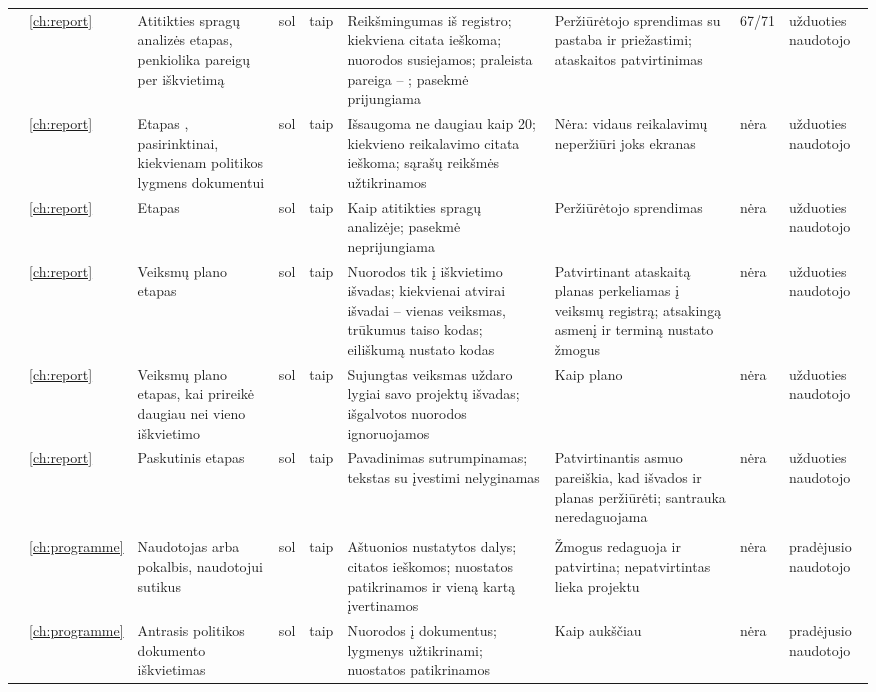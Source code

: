 \begin{landscape}
\begin{xltabular}{\linewidth}{@{}>{\scriptsize}L{31mm}>{\scriptsize}L{6mm}>{\scriptsize}L{36mm}>{\scriptsize}L{15mm}>{\scriptsize}L{9mm}>{\scriptsize}Y>{\scriptsize}L{38mm}>{\scriptsize}L{19mm}>{\scriptsize}L{25mm}@{}}
 & \ref{ch:report} & Atitikties spragų analizės etapas, penkiolika pareigų per iškvietimą & sol & taip & Reikšmingumas iš registro; kiekviena citata ieškoma; nuorodos susiejamos; praleista pareiga -- ; pasekmė prijungiama & Peržiūrėtojo sprendimas su pastaba ir priežastimi; ataskaitos patvirtinimas &  67/71 & užduoties naudotojo \\
 & \ref{ch:report} & Etapas , pasirinktinai, kiekvienam politikos lygmens dokumentui & sol & taip & Išsaugoma ne daugiau kaip 20; kiekvieno reikalavimo citata ieškoma; sąrašų reikšmės užtikrinamos & Nėra: vidaus reikalavimų neperžiūri joks ekranas & nėra & užduoties naudotojo \\
 & \ref{ch:report} & Etapas  & sol & taip & Kaip atitikties spragų analizėje; pasekmė neprijungiama & Peržiūrėtojo sprendimas & nėra & užduoties naudotojo \\
 & \ref{ch:report} & Veiksmų plano etapas & sol & taip & Nuorodos tik į iškvietimo išvadas; kiekvienai atvirai išvadai -- vienas veiksmas, trūkumus taiso kodas; eiliškumą nustato kodas & Patvirtinant ataskaitą planas perkeliamas į veiksmų registrą; atsakingą asmenį ir terminą nustato žmogus & nėra & užduoties naudotojo \\
 & \ref{ch:report} & Veiksmų plano etapas, kai prireikė daugiau nei vieno iškvietimo & sol & taip & Sujungtas veiksmas uždaro lygiai savo projektų išvadas; išgalvotos nuorodos ignoruojamos & Kaip plano & nėra & užduoties naudotojo \\
 & \ref{ch:report} & Paskutinis etapas & sol & taip & Pavadinimas sutrumpinamas; tekstas su įvestimi nelyginamas & Patvirtinantis asmuo pareiškia, kad išvados ir planas peržiūrėti; santrauka neredaguojama & nėra & užduoties naudotojo \\
\midrule
{} \\
 & \ref{ch:programme} & Naudotojas arba pokalbis, naudotojui sutikus & sol & taip & Aštuonios nustatytos dalys; citatos ieškomos; nuostatos patikrinamos ir vieną kartą įvertinamos & Žmogus redaguoja ir patvirtina; nepatvirtintas lieka projektu & nėra & pradėjusio naudotojo \\
 & \ref{ch:programme} & Antrasis politikos dokumento iškvietimas & sol & taip & Nuorodos į dokumentus; lygmenys užtikrinami; nuostatos patikrinamos & Kaip aukščiau & nėra & pradėjusio naudotojo \\

\end{xltabular}
\end{landscape}
